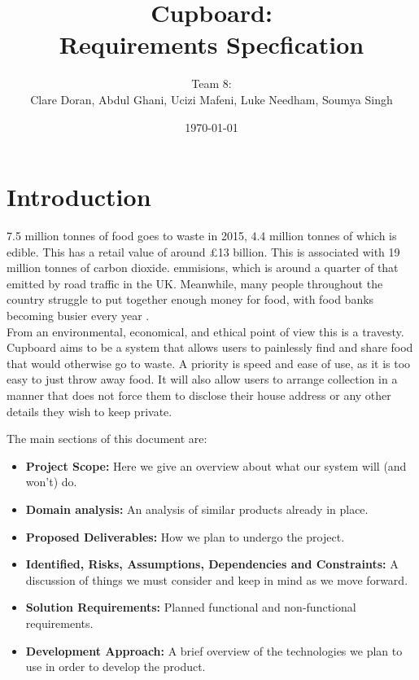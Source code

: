 \documentclass[12pt]{article}
\title{Cupboard:\\Requirements Specfication}
\author{Team 8:\\Clare Doran, Abdul Ghani, Ucizi Mafeni, Luke Needham, Soumya Singh}
\date{\today}
\begin{document}
\maketitle

\tableofcontents
\clearpage


\section{Introduction}

7.5 million tonnes of food goes to waste in 2015, 4.4 million tonnes of which is edible.
This has a retail value of around £13 billion. This is associated with 19 million tonnes of carbon dioxide.
emmisions, which is around a quarter of that emitted by road traffic in the UK\cite{wrap}.
Meanwhile,  many people throughout the country struggle to put together enough 
money for food, with food banks becoming busier every year \cite{trussel}.\\
From an environmental, economical, and ethical point of view this is a travesty.\\
Cupboard aims to be a system that allows users to painlessly find and share food
that would otherwise go to waste. A priority is speed and ease of use, as it is
too easy to just throw away food. 
It will also allow users to arrange collection in a manner that does not force
them to disclose their house address or any other details they wish to keep
private.

The main sections of this document are:
\begin{itemize}
	\item \textbf{Project Scope:} Here we give an overview about what our system will (and won't) do.
	\item \textbf{Domain analysis:} An analysis of similar products already in place.
	\item \textbf{Proposed Deliverables:} How we plan to undergo the project.
	\item \textbf{Identified, Risks, Assumptions, Dependencies and Constraints:} A discussion of things we must consider and keep in mind as we move forward.
	\item \textbf{Solution Requirements:} Planned functional and non-functional requirements.
	\item \textbf{Development Approach:} A brief overview of the technologies we plan to use in order to develop the product.
\end{itemize}
\end{document}

